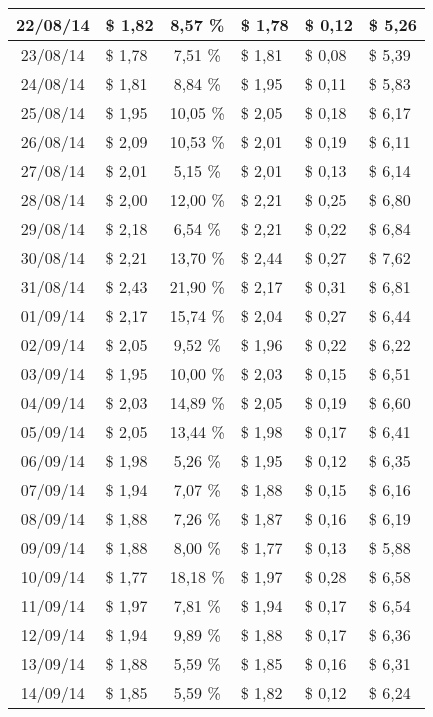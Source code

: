 \begin{center}
\begin{small}
\begin{longtable}{|c|l|c|l|l|l|}
22/08/14 & \$ 1,82 & 8,57 \% & \$ 1,78 & \$ 0,12 & \$ 5,26 \\ \hline
23/08/14 & \$ 1,78 & 7,51 \% & \$ 1,81 & \$ 0,08 & \$ 5,39 \\ \hline
24/08/14 & \$ 1,81 & 8,84 \% & \$ 1,95 & \$ 0,11 & \$ 5,83 \\ \hline
25/08/14 & \$ 1,95 & 10,05 \% & \$ 2,05 & \$ 0,18 & \$ 6,17 \\ \hline
26/08/14 & \$ 2,09 & 10,53 \% & \$ 2,01 & \$ 0,19 & \$ 6,11 \\ \hline
27/08/14 & \$ 2,01 & 5,15 \% & \$ 2,01 & \$ 0,13 & \$ 6,14 \\ \hline
28/08/14 & \$ 2,00 & 12,00 \% & \$ 2,21 & \$ 0,25 & \$ 6,80 \\ \hline
29/08/14 & \$ 2,18 & 6,54 \% & \$ 2,21 & \$ 0,22 & \$ 6,84 \\ \hline
30/08/14 & \$ 2,21 & 13,70 \% & \$ 2,44 & \$ 0,27 & \$ 7,62 \\ \hline
31/08/14 & \$ 2,43 & 21,90 \% & \$ 2,17 & \$ 0,31 & \$ 6,81 \\ \hline
01/09/14 & \$ 2,17 & 15,74 \% & \$ 2,04 & \$ 0,27 & \$ 6,44 \\ \hline
02/09/14 & \$ 2,05 & 9,52 \% & \$ 1,96 & \$ 0,22 & \$ 6,22 \\ \hline
03/09/14 & \$ 1,95 & 10,00 \% & \$ 2,03 & \$ 0,15 & \$ 6,51 \\ \hline
04/09/14 & \$ 2,03 & 14,89 \% & \$ 2,05 & \$ 0,19 & \$ 6,60 \\ \hline
05/09/14 & \$ 2,05 & 13,44 \% & \$ 1,98 & \$ 0,17 & \$ 6,41 \\ \hline
06/09/14 & \$ 1,98 & 5,26 \% & \$ 1,95 & \$ 0,12 & \$ 6,35 \\ \hline
07/09/14 & \$ 1,94 & 7,07 \% & \$ 1,88 & \$ 0,15 & \$ 6,16 \\ \hline
08/09/14 & \$ 1,88 & 7,26 \% & \$ 1,87 & \$ 0,16 & \$ 6,19 \\ \hline
09/09/14 & \$ 1,88 & 8,00 \% & \$ 1,77 & \$ 0,13 & \$ 5,88 \\ \hline
10/09/14 & \$ 1,77 & 18,18 \% & \$ 1,97 & \$ 0,28 & \$ 6,58 \\ \hline
11/09/14 & \$ 1,97 & 7,81 \% & \$ 1,94 & \$ 0,17 & \$ 6,54 \\ \hline
12/09/14 & \$ 1,94 & 9,89 \% & \$ 1,88 & \$ 0,17 & \$ 6,36 \\ \hline
13/09/14 & \$ 1,88 & 5,59 \% & \$ 1,85 & \$ 0,16 & \$ 6,31 \\ \hline
14/09/14 & \$ 1,85 & 5,59 \% & \$ 1,82 & \$ 0,12 & \$ 6,24 \\ \hline

\end{longtable}
\end{small}
\end{center}
